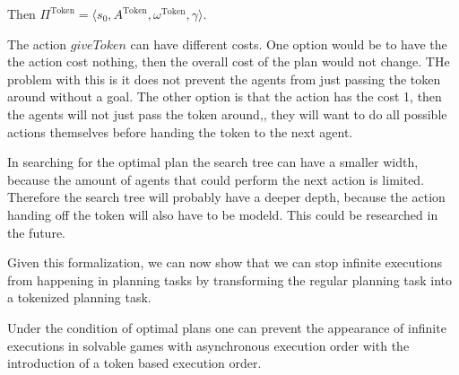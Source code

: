 Then $ \Pi^{\text{Token}} = \langle s_0, A ^{\text{Token}}, \omega ^{\text{Token}}, \gamma \rangle $.

The action $giveToken$ can have different costs. One option would be to have the the action cost nothing, then the overall cost of the plan would not change. THe problem with this is it does not prevent the agents from just passing the token around without a goal. The other option is that the action has the cost 1, then the agents will not just pass the token around,, they will want to do all possible actions themselves before handing the token to the next agent.

In searching for the optimal plan the search tree can have a smaller width, because the amount of agents that could perform the next action is limited. Therefore the search tree will probably have a deeper depth, because the action handing off the token will also have to be modeld. This could be researched in the future.


Given this formalization, we can now show that we can stop infinite executions from happening in planning tasks by transforming the regular planning task into a tokenized planning task.

\begin{theorem}
Under the condition of optimal plans one can prevent the appearance of infinite executions in solvable games with asynchronous execution order with the introduction of a token based execution order.
\end{theorem}

